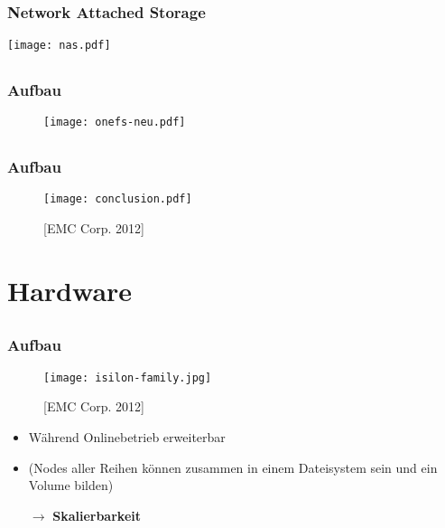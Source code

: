 \documentclass{beamer}
\begin{document}
\subsection{}
\begin{frame}[fragile]
  \frametitle{Network Attached Storage}
  \begin{center}\texttt{[image: nas.pdf]}\end{center}
\end{frame}

\subsection{}
\begin{frame}[fragile]
  \frametitle{Aufbau}
  
  \begin{figure}[htp]
    \centering
    \texttt{[image: onefs-neu.pdf]}
  \end{figure}

\end{frame}


\subsection{}
\begin{frame}[fragile]
  \frametitle{Aufbau}
  
  \begin{figure}[htp]
    \centering
    \texttt{[image: conclusion.pdf]}
    \caption{[EMC Corp. 2012]}
  \end{figure}

\end{frame}

\section{Hardware}

\subsection{}

  \begin{frame}[fragile]
  \frametitle{Aufbau}
  
  \begin{figure}[htp]
    \centering
    \texttt{[image: isilon-family.jpg]}
    \caption{[EMC Corp. 2012]}
  \end{figure}
  
  \vspace{-5mm}
  
  \begin{itemize} 
    \item Während Onlinebetrieb erweiterbar
    \item (Nodes aller Reihen können zusammen in einem Dateisystem sein und ein Volume bilden) 
    \vspace{1mm}
    \item[$\rightarrow$] \textbf{Skalierbarkeit}
    \end{itemize}

\end{frame}
\end{document}

